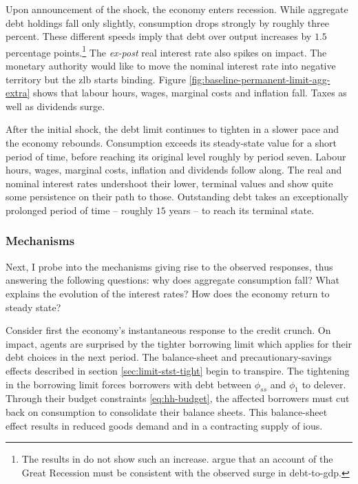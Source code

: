 \documentclass[a4paper,12pt]{article} %
\numberwithin{equation}{section} %
\numberwithin{figure}{section}
\numberwithin{table}{section}
\begin{document}
Upon announcement of the shock, the economy enters recession. While aggregate debt holdings fall only slightly, consumption drops strongly by roughly three percent. These different speeds imply that debt over output increases by $1.5$ percentage points.\footnote{The results in \textcite{gl2017} do not show such an increase. \textcite{justiniano2015} argue that an account of the Great Recession must be consistent with the observed surge in debt-to-\Gls{gdp}.} The \textit{ex-post} real interest rate also spikes on impact. The monetary authority would like to move the nominal interest rate into negative territory but the \Gls{zlb} starts binding. Figure \ref{fig:baseline-permanent-limit-agg-extra} shows that labour hours, wages, marginal costs and inflation fall. Taxes as well as dividends surge.

After the initial shock, the debt limit continues to tighten in a slower pace and the economy rebounds. Consumption exceeds its steady-state value for a short period of time, before reaching its original level roughly by period seven. Labour hours, wages, marginal costs, inflation and dividends follow along. The real and nominal interest rates undershoot their lower, terminal values and show quite some persistence on their path to those. Outstanding debt takes an exceptionally prolonged period of time -- roughly $15$ years -- to reach its terminal state. 

\subsubsection{Mechanisms}
\label{sec:limit-transition-mechanisms}

Next, I probe into the mechanisms giving rise to the observed responses, thus answering the following questions: why does aggregate consumption fall? What explains the evolution of the interest rates? How does the economy return to steady state?

Consider first the economy's instantaneous response to the credit crunch. On impact, agents are surprised by the tighter borrowing limit which applies for their debt choices in the next period. The balance-sheet and precautionary-savings effects described in section \ref{sec:limit-stst-tight} begin to transpire. The tightening in the borrowing limit forces borrowers with debt between $\phi_{ss}$ and $\phi_1$ to delever. Through their budget constraints \eqref{eq:hh-budget}, the affected borrowers must cut back on consumption to consolidate their balance sheets. This balance-sheet effect results in reduced goods demand and in a contracting supply of \Gls{iou}s.
\end{document}
